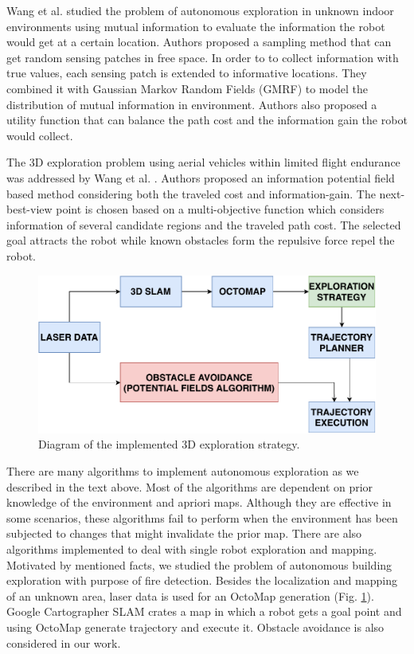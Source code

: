 Wang et al. \cite{Wang2018} studied the problem of autonomous exploration in unknown indoor environments using mutual information to evaluate the information the robot would get at a certain location. Authors proposed a
sampling method that can get random sensing patches in free space. In order to to collect information with true values, each sensing patch is extended to informative locations. They combined it with Gaussian
Markov Random Fields (GMRF) to model the distribution of mutual information in environment.  Authors also proposed a utility function that can balance the path cost and the information gain the robot
would collect.

The 3D exploration problem using aerial vehicles within limited flight endurance was addressed by Wang et al. \cite{Wang2019}. Authors proposed an information potential field based method considering both the traveled cost and information-gain. The next-best-view point is chosen based on a multi-objective function which considers information of several candidate regions and the traveled path cost. The selected goal
attracts the robot while known obstacles form the repulsive
force repel the robot.



\begin{figure}[t!]
	\centering
	\includegraphics[width=1.0\columnwidth]{./pictures/3D_strategy.pdf}	
	\caption{Diagram of the implemented 3D exploration strategy.}
	\label{fig:3D_strategy}
\end{figure}


There are many algorithms to implement autonomous exploration as we described in the text above. Most of the algorithms are dependent on prior knowledge of the environment and apriori maps. Although
they are effective in some scenarios, these algorithms fail to
perform when the environment has been subjected to changes
that might invalidate the prior map. There are also algorithms implemented to deal with single robot exploration and mapping. Motivated by mentioned facts, we studied the problem of autonomous building exploration with purpose of fire detection. 
Besides
the localization and mapping of an unknown area, laser data is used for an OctoMap generation (Fig. \ref{fig:3D_strategy}). Google Cartographer SLAM crates a map in which a robot gets a goal point and using OctoMap generate trajectory and execute it. Obstacle avoidance is also considered in our work.